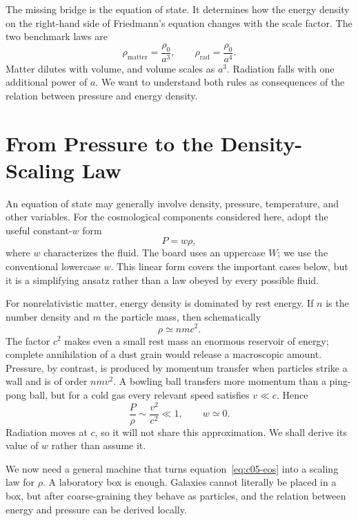The missing bridge is the equation of state. It determines how the energy density on the right-hand side of Friedmann's equation changes with the scale factor. The two benchmark laws are
\begin{equation}
\rho_{\text{matter}}=\frac{\rho_0}{a^3},
\qquad
\rho_{\text{rad}}=\frac{\rho_0}{a^4}.
\label{eq:c05-benchmark-densities}
\end{equation}
Matter dilutes with volume, and volume scales as \(a^3\). Radiation falls with one additional power of \(a\). We want to understand both rules as consequences of the relation between pressure and energy density.

\section{From Pressure to the Density-Scaling Law}

An equation of state may generally involve density, pressure, temperature, and other variables. For the cosmological components considered here, adopt the useful constant-\(w\) form
\begin{equation}
P=w\rho,
\label{eq:c05-eos}
\end{equation}
where \(w\) characterizes the fluid. The board uses an uppercase \(W\); we use the conventional lowercase \(w\). This linear form covers the important cases below, but it is a simplifying ansatz rather than a law obeyed by every possible fluid.

For nonrelativistic matter, energy density is dominated by rest energy. If \(n\) is the number density and \(m\) the particle mass, then schematically
\begin{equation}
\rho\simeq nmc^2.
\end{equation}
The factor \(c^2\) makes even a small rest mass an enormous reservoir of energy; complete annihilation of a dust grain would release a macroscopic amount. Pressure, by contrast, is produced by momentum transfer when particles strike a wall and is of order \(nmv^2\). A bowling ball transfers more momentum than a ping-pong ball, but for a cold gas every relevant speed satisfies \(v\ll c\). Hence
\begin{equation}
\frac{P}{\rho}\sim\frac{v^2}{c^2}\ll1,
\qquad
w\simeq0.
\label{eq:c05-dust-eos}
\end{equation}
Radiation moves at \(c\), so it will not share this approximation. We shall derive its value of \(w\) rather than assume it.

We now need a general machine that turns equation~\eqref{eq:c05-eos} into a scaling law for \(\rho\). A laboratory box is enough. Galaxies cannot literally be placed in a box, but after coarse-graining they behave as particles, and the relation between energy and pressure can be derived locally.

